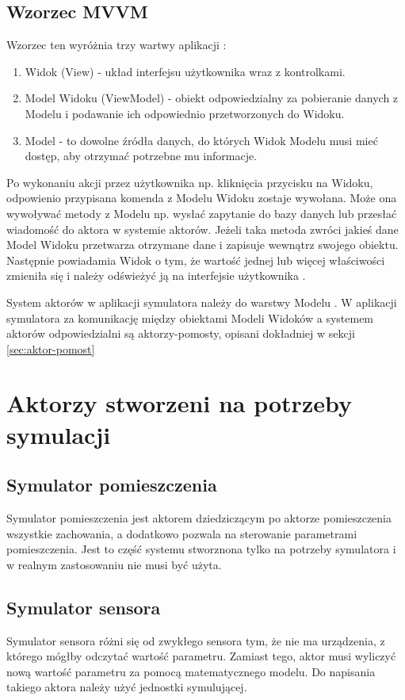 \subsection{Wzorzec MVVM}
Wzorzec ten wyróżnia trzy wartwy aplikacji :
\begin{enumerate}
    \item Widok (View) - układ interfejsu użytkownika wraz z kontrolkami. 
    \item Model Widoku (ViewModel) - obiekt odpowiedzialny za pobieranie danych z Modelu i podawanie ich odpowiednio przetworzonych do Widoku. 
    \item Model - to dowolne źródła danych, do których Widok Modelu musi mieć dostęp, aby otrzymać potrzebne mu informacje. 
\end{enumerate}


Po wykonaniu akcji przez użytkownika np. kliknięcia przycisku na Widoku, odpowienio przypisana komenda z Modelu Widoku zostaje wywołana. 
Może ona wywoływać metody z Modelu np. wysłać zapytanie do bazy danych lub przesłać wiadomość do aktora w systemie aktorów.
Jeżeli taka metoda zwróci jakieś dane Model Widoku przetwarza otrzymane dane i zapisuje wewnątrz swojego obiektu. 
Następnie powiadamia Widok o tym, że wartość jednej lub więcej właściwości zmieniła się i należy odświeżyć ją na interfejsie użytkownika .


System aktorów w aplikacji symulatora należy do warstwy Modelu .
W aplikacji symulatora za komunikację między obiektami Modeli Widoków a systemem aktorów odpowiedzialni są aktorzy-pomosty, opisani dokładniej w sekcji \ref{sec:aktor-pomost}



\section{Aktorzy stworzeni na potrzeby symulacji}
\subsection{Symulator pomieszczenia}
Symulator pomieszczenia jest aktorem dziedziczącym po aktorze pomieszczenia wszystkie zachowania, a dodatkowo pozwala na sterowanie parametrami pomieszczenia. Jest to część systemu stworznona tylko na potrzeby symulatora i w realnym zastosowaniu nie musi być użyta.

\subsection{Symulator sensora}
Symulator sensora różni się od zwykłego sensora tym, że nie ma urządzenia, z którego mógłby odczytać wartość parametru. 
Zamiast tego, aktor musi wyliczyć nową wartość parametru za pomocą matematycznego modelu. Do napisania takiego aktora należy użyć jednostki symulującej.  

